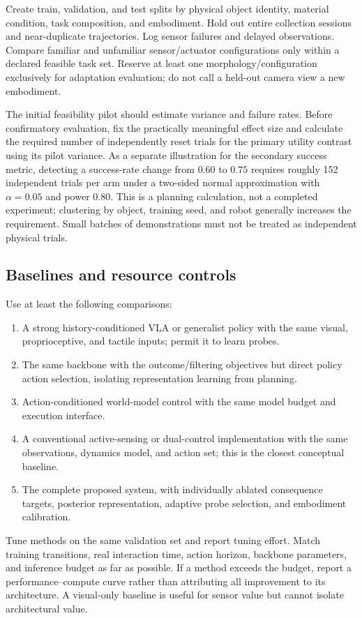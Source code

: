 \documentclass[11pt]{article}
\begin{document}
Create train, validation, and test splits by physical object identity, material condition, task composition, and embodiment. Hold out entire collection sessions and near-duplicate trajectories. Log sensor failures and delayed observations. Compare familiar and unfamiliar sensor/actuator configurations only within a declared feasible task set. Reserve at least one morphology/configuration exclusively for adaptation evaluation; do not call a held-out camera view a new embodiment.

The initial feasibility pilot should estimate variance and failure rates. Before confirmatory evaluation, fix the practically meaningful effect size and calculate the required number of independently reset trials for the primary utility contrast using its pilot variance. As a separate illustration for the secondary success metric, detecting a success-rate change from $0.60$ to $0.75$ requires roughly 152 independent trials per arm under a two-sided normal approximation with $\alpha=0.05$ and power $0.80$. This is a planning calculation, not a completed experiment; clustering by object, training seed, and robot generally increases the requirement. Small batches of demonstrations must not be treated as independent physical trials.

\subsection{Baselines and resource controls}
Use at least the following comparisons:
\begin{enumerate}
\item A strong history-conditioned VLA or generalist policy with the same visual, proprioceptive, and tactile inputs; permit it to learn probes.
\item The same backbone with the outcome/filtering objectives but direct policy action selection, isolating representation learning from planning.
\item Action-conditioned world-model control with the same model budget and execution interface.
\item A conventional active-sensing or dual-control implementation with the same observations, dynamics model, and action set; this is the closest conceptual baseline.
\item The complete proposed system, with individually ablated consequence targets, posterior representation, adaptive probe selection, and embodiment calibration.
\end{enumerate}
Tune methods on the same validation set and report tuning effort. Match training transitions, real interaction time, action horizon, backbone parameters, and inference budget as far as possible. If a method exceeds the budget, report a performance--compute curve rather than attributing all improvement to its architecture. A visual-only baseline is useful for sensor value but cannot isolate architectural value.
\end{document}
